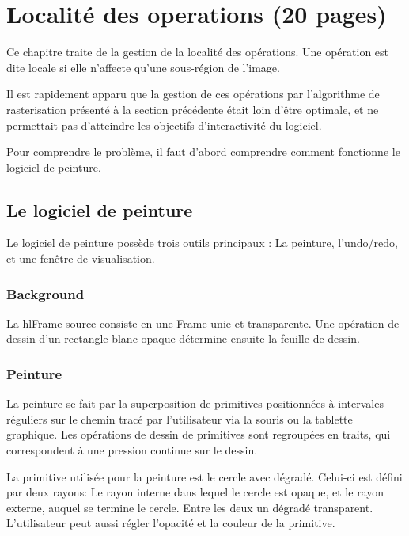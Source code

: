 \chapter{Localité des operations (20 pages)}
	Ce chapitre traite de la gestion de la localité des opérations. Une
	opération est dite locale si elle n'affecte qu'une sous-région de l'image.

	Il est rapidement apparu que la gestion de ces opérations par l'algorithme
	de rasterisation présenté à la section précédente était loin d'être optimale,
	et ne permettait pas d'atteindre les objectifs d'interactivité du logiciel.

	Pour comprendre le problème, il faut d'abord comprendre comment fonctionne le
	logiciel de peinture. 
	\section{Le logiciel de peinture}
		Le logiciel de peinture possède trois outils principaux : La peinture,
		l'undo/redo, et une fenêtre de visualisation.
		\subsection{Background}
			La hlFrame source consiste en une Frame unie et transparente.
			Une opération de dessin d'un rectangle blanc opaque détermine ensuite
			la feuille de dessin.

		\subsection{Peinture}
			La peinture se fait par la superposition de primitives positionnées
			à intervales réguliers sur le chemin tracé par l'utilisateur via la
			souris ou la tablette graphique. Les opérations de dessin de primitives 
			sont regroupées en traits, qui correspondent à une pression 
			continue sur le dessin. 

			La primitive utilisée pour la peinture est le cercle avec dégradé. Celui-ci
			est défini par deux rayons: Le rayon interne dans lequel le cercle est opaque,
			et le rayon externe, auquel se termine le cercle. Entre les deux un dégradé
			transparent. L'utilisateur peut aussi régler 
			l'opacité et la couleur de la primitive.


